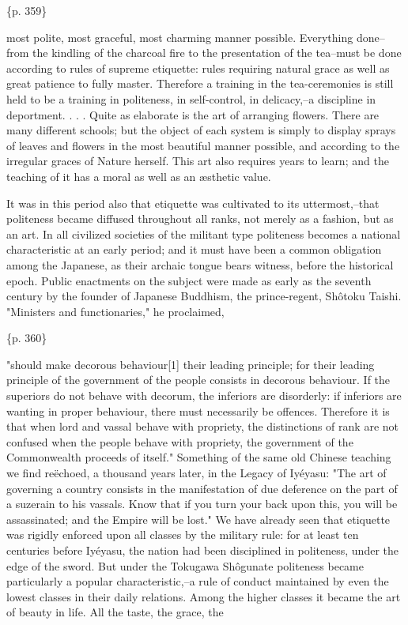 \{p. 359\}

most polite, most graceful, most charming manner possible. Everything done--from the kindling of the charcoal fire to the presentation of the tea--must be done according to rules of supreme etiquette: rules requiring natural grace as well as great patience to fully master. Therefore a training in the tea-ceremonies is still held to be a training in politeness, in self-control, in delicacy,--a discipline in deportment. . . . Quite as elaborate is the art of arranging flowers. There are many different schools; but the object of each system is simply to display sprays of leaves and flowers in the most beautiful manner possible, and according to the irregular graces of Nature herself. This art also requires years to learn; and the teaching of it has a moral as well as an æsthetic value.



It was in this period also that etiquette was cultivated to its uttermost,--that politeness became diffused throughout all ranks, not merely as a fashion, but as an art. In all civilized societies of the militant type politeness becomes a national characteristic at an early period; and it must have been a common obligation among the Japanese, as their archaic tongue bears witness, before the historical epoch. Public enactments on the subject were made as early as the seventh century by the founder of Japanese Buddhism, the prince-regent, Shôtoku Taishi. "Ministers and functionaries," he proclaimed,

\{p. 360\}

"should make decorous behaviour[1] their leading principle; for their leading principle of the government of the people consists in decorous behaviour. If the superiors do not behave with decorum, the inferiors are disorderly: if inferiors are wanting in proper behaviour, there must necessarily be offences. Therefore it is that when lord and vassal behave with propriety, the distinctions of rank are not confused when the people behave with propriety, the government of the Commonwealth proceeds of itself." Something of the same old Chinese teaching we find reëchoed, a thousand years later, in the Legacy of Iyéyasu: "The art of governing a country consists in the manifestation of due deference on the part of a suzerain to his vassals. Know that if you turn your back upon this, you will be assassinated; and the Empire will be lost." We have already seen that etiquette was rigidly enforced upon all classes by the military rule: for at least ten centuries before Iyéyasu, the nation had been disciplined in politeness, under the edge of the sword. But under the Tokugawa Shôgunate politeness became particularly a popular characteristic,--a rule of conduct maintained by even the lowest classes in their daily relations. Among the higher classes it became the art of beauty in life. All the taste, the grace, the

